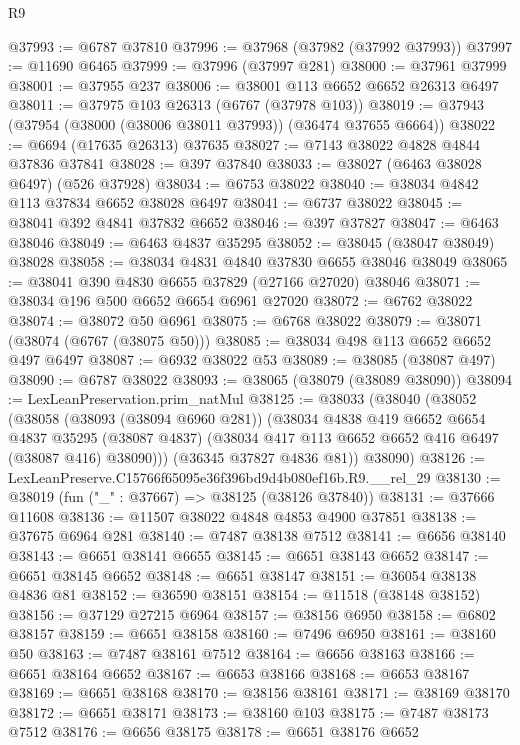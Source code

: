 \begin{lexlean}{R9}
\begin{coremodule}
@37993 := @6787 @37810
@37996 := @37968 (@37982 (@37992 @37993))
@37997 := @11690 @6465
@37999 := @37996 (@37997 @281)
@38000 := @37961 @37999
@38001 := @37955 @237
@38006 := @38001 @113 @6652 @6652 @26313 @6497
@38011 := @37975 @103 @26313 (@6767 (@37978 @103))
@38019 := @37943 (@37954 (@38000 (@38006 @38011 @37993)) (@36474 @37655 @6664))
@38022 := @6694 (@17635 @26313) @37635
@38027 := @7143 @38022 @4828 @4844 @37836 @37841
@38028 := @397 @37840
@38033 := @38027 (@6463 @38028 @6497) (@526 @37928)
@38034 := @6753 @38022
@38040 := @38034 @4842 @113 @37834 @6652 @38028 @6497
@38041 := @6737 @38022
@38045 := @38041 @392 @4841 @37832 @6652
@38046 := @397 @37827
@38047 := @6463 @38046
@38049 := @6463 @4837 @35295
@38052 := @38045 (@38047 @38049) @38028
@38058 := @38034 @4831 @4840 @37830 @6655 @38046 @38049
@38065 := @38041 @390 @4830 @6655 @37829 (@27166 @27020) @38046
@38071 := @38034 @196 @500 @6652 @6654 @6961 @27020
@38072 := @6762 @38022
@38074 := @38072 @50 @6961
@38075 := @6768 @38022
@38079 := @38071 (@38074 (@6767 (@38075 @50)))
@38085 := @38034 @498 @113 @6652 @6652 @497 @6497
@38087 := @6932 @38022 @53
@38089 := @38085 (@38087 @497)
@38090 := @6787 @38022
@38093 := @38065 (@38079 (@38089 @38090))
@38094 := LexLeanPreservation.prim_natMul
@38125 := @38033
    (@38040
      (@38052
        (@38058
          (@38093 (@38094 @6960 @281))
          (@38034
            @4838
            @419
            @6652
            @6654
            @4837
            @35295
            (@38087 @4837)
            (@38034 @417 @113 @6652 @6652 @416 @6497 (@38087 @416) @38090)))
        (@36345 @37827 @4836 @81))
      @38090)
@38126 := LexLeanPreserve.C15766f65095e36f396bd9d4b080ef16b.R9.__rel_29
@38130 := @38019 (fun ("_" : @37667) => @38125 (@38126 @37840))
@38131 := @37666 @11608
@38136 := @11507 @38022 @4848 @4853 @4900 @37851
@38138 := @37675 @6964 @281
@38140 := @7487 @38138 @7512
@38141 := @6656 @38140
@38143 := @6651 @38141 @6655
@38145 := @6651 @38143 @6652
@38147 := @6651 @38145 @6652
@38148 := @6651 @38147
@38151 := @36054 @38138 @4836 @81
@38152 := @36590 @38151
@38154 := @11518 (@38148 @38152)
@38156 := @37129 @27215 @6964
@38157 := @38156 @6950
@38158 := @6802 @38157
@38159 := @6651 @38158
@38160 := @7496 @6950
@38161 := @38160 @50
@38163 := @7487 @38161 @7512
@38164 := @6656 @38163
@38166 := @6651 @38164 @6652
@38167 := @6653 @38166
@38168 := @6653 @38167
@38169 := @6651 @38168
@38170 := @38156 @38161
@38171 := @38169 @38170
@38172 := @6651 @38171
@38173 := @38160 @103
@38175 := @7487 @38173 @7512
@38176 := @6656 @38175
@38178 := @6651 @38176 @6652

\end{coremodule}
\end{lexlean}
